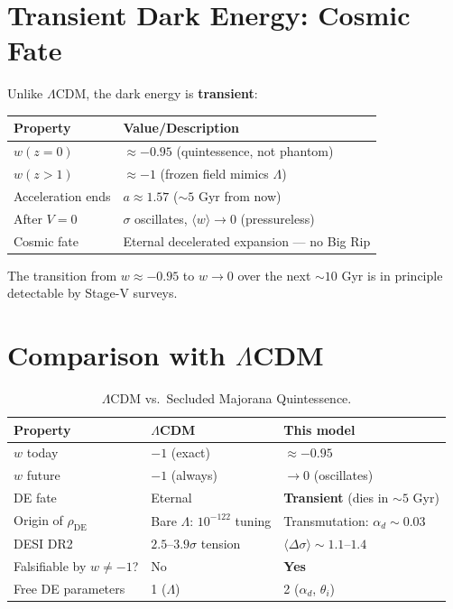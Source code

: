 \documentclass[11pt,a4paper]{article}
\begin{document}
\section{Transient Dark Energy: Cosmic Fate}
\label{sec:fate}

Unlike $\Lambda$CDM, the dark energy is \textbf{transient}:

\begin{center}
\begin{tabular}{@{}ll@{}}
\toprule
\textbf{Property} & \textbf{Value/Description} \\
\midrule
$w(z=0)$ & $\approx -0.95$ (quintessence, not phantom) \\
$w(z>1)$ & $\approx -1$ (frozen field mimics $\Lambda$) \\
Acceleration ends & $a \approx 1.57$ ($\sim 5$ Gyr from now) \\
After $V=0$ & $\sigma$ oscillates, $\langle w\rangle \to 0$ (pressureless) \\
Cosmic fate & Eternal decelerated expansion --- no Big Rip \\
\bottomrule
\end{tabular}
\end{center}

\noindent
The transition from $w\approx-0.95$ to $w\to 0$ over the next $\sim 10$ Gyr
is in principle detectable by Stage-V surveys.

\section{Comparison with $\Lambda$CDM}
\label{sec:comparison}

\begin{table}[H]
\centering
\caption{$\Lambda$CDM vs.\ Secluded Majorana Quintessence.}
\label{tab:comparison}
\begin{tabular}{@{}lll@{}}
\toprule
Property & $\Lambda$CDM & This model \\
\midrule
$w$ today & $-1$ (exact) & $\approx -0.95$ \\
$w$ future & $-1$ (always) & $\to 0$ (oscillates) \\
DE fate & Eternal & \textbf{Transient} (dies in $\sim 5$ Gyr) \\
Origin of $\rho_\mathrm{DE}$ & Bare $\Lambda$: $10^{-122}$ tuning & Transmutation: $\alpha_d\sim 0.03$ \\
DESI DR2 & $2.5$--$3.9\sigma$ tension & $\langle\Delta\sigma\rangle\sim 1.1$--$1.4$ \\
Falsifiable by $w\neq -1$? & No & \textbf{Yes} \\
Free DE parameters & 1 ($\Lambda$) & 2 ($\alpha_d$, $\theta_i$) \\
\bottomrule
\end{tabular}
\end{table}
\end{document}
